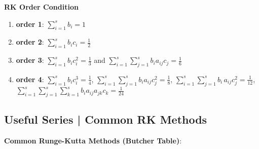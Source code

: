\documentclass[9pt]{article}
\begin{document}
\textbf{RK Order Condition}
\begin{enumerate}[itemsep=-2pt, topsep=-2pt]
    \item \textbf{order 1}: \( \sum_{i=1}^{s} b_i = 1\)
    \item \textbf{order 2}: \( \sum_{i=1}^{s} b_i c_i = \frac{1}{2}\)
    \item \textbf{order 3}: \( \sum_{i=1}^{s} b_i c_i^2 = \frac{1}{3}\) \quad and \quad \( \sum_{i=1}^{s}\sum_{j=1}^{s} b_i a_{ij} c_j = \frac{1}{6}\)
    \item \textbf{order 4}: \( \sum_{i=1}^{s} b_i c_i^3 = \frac{1}{4}\), \quad \( \sum_{i=1}^{s}\sum_{j=1}^{s} b_i a_{ij} c_j^2 = \frac{1}{8}\), \quad \( \sum_{i=1}^{s}\sum_{j=1}^{s} b_i \,a_{ij} c^2_j = \frac{1}{12}\), \quad \( \sum_{i=1}^{s}\sum_{j=1}^{s}\sum_{k=1}^{s} b_i a_{ij} a_{jk} c_k = \frac{1}{24}\)
\end{enumerate}


\subsection{Useful Series | Common RK Methods} %

\textbf{Common Runge-Kutta Methods (Butcher Table)}:
\end{document}
